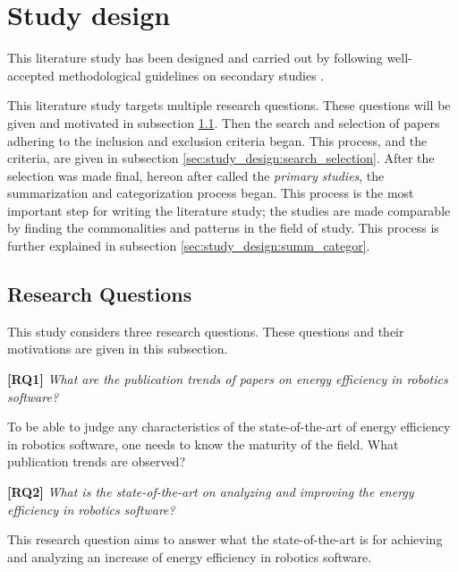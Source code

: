 \section{Study design}
\label{sec:study_design}
This literature study has been designed and carried out by following 
well-accepted methodological guidelines on secondary studies
\cite{petersen2015guidelines_systematic, kitchenham2013systematic_review_guidelines, wohlin2012experimentation}.

This literature study targets multiple research questions. 
These questions will be given and motivated in subsection \ref{sec:study_design:research_questions}.
Then the search and selection of papers adhering to the inclusion and exclusion criteria began.
This process, and the criteria, are given in subsection \ref{sec:study_design:search_selection}.
After the selection was made final, hereon after called the \textit{primary studies}, the summarization and categorization process began. 
This process is the most important step for writing the literature study; the studies are made comparable by finding the commonalities and patterns in the field of study. 
This process is further explained in subsection \ref{sec:study_design:summ_categor}.


\subsection{Research Questions}
\label{sec:study_design:research_questions}
This study considers three research questions. These questions and their motivations are given in this subsection.

\vspace{5mm}

\textbf{[RQ1]} \textit{What are the publication trends of papers on energy efficiency in robotics software?}

\vspace{5mm}

To be able to judge any characteristics of the state-of-the-art of energy efficiency in robotics software, one needs to know the maturity of the field.
What publication trends are observed?

\vspace{5mm}

\textbf{[RQ2]} \textit{What is the state-of-the-art on analyzing and improving the energy efficiency in robotics software?}

\vspace{5mm}

This research question aims to answer what the state-of-the-art is for achieving and analyzing an increase of energy efficiency in robotics software.

